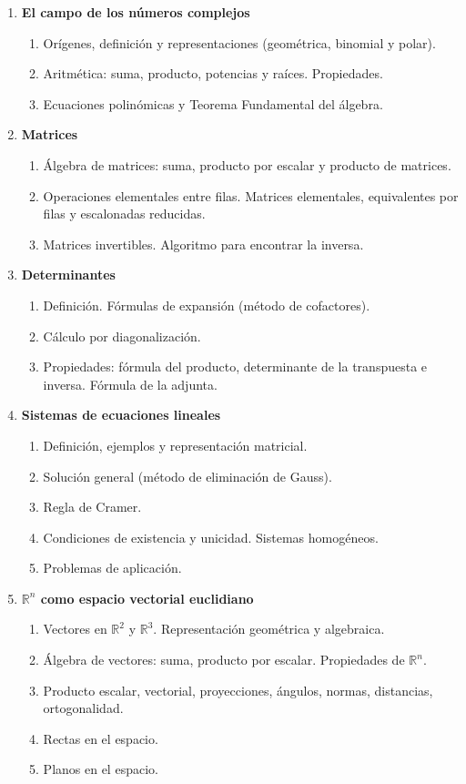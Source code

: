 \begin{enumerate}
\item \textbf{El campo de los números complejos}
\begin{enumerate}
\item Orígenes, definición y representaciones (geométrica, binomial y polar).
\item Aritmética: suma, producto, potencias y raíces. Propiedades.
\item Ecuaciones polinómicas y Teorema Fundamental del álgebra.
\end{enumerate}

\item \textbf{Matrices}
\begin{enumerate}
\item Álgebra de matrices: suma, producto por escalar y producto de matrices.
\item Operaciones elementales entre filas. Matrices elementales, equivalentes por filas y escalonadas reducidas.
\item Matrices invertibles. Algoritmo para encontrar la inversa.
\end{enumerate}

\item \textbf{Determinantes}
\begin{enumerate}
\item Definición. Fórmulas de expansión (método de cofactores).
\item Cálculo por diagonalización.
\item Propiedades: fórmula del producto, determinante de la transpuesta e inversa. Fórmula de la adjunta.
\end{enumerate}

\item \textbf{Sistemas de ecuaciones lineales}
\begin{enumerate}
\item Definición, ejemplos y representación matricial.
\item Solución general (método de eliminación de Gauss).
\item Regla de Cramer.
\item Condiciones de existencia y unicidad. Sistemas homogéneos.
\item Problemas de aplicación.
\end{enumerate}

\item \textbf{$\mathbb{R}^n$ como espacio vectorial euclidiano}
\begin{enumerate}
\item Vectores en $\mathbb{R}^2$ y $\mathbb{R}^3$. Representación geométrica y algebraica.
\item Álgebra de vectores: suma, producto por escalar. Propiedades de $\mathbb{R}^n$.
\item Producto escalar, vectorial, proyecciones, ángulos, normas, distancias, ortogonalidad.
\item Rectas en el espacio.
\item Planos en el espacio.
\end{enumerate}


\end{enumerate}

